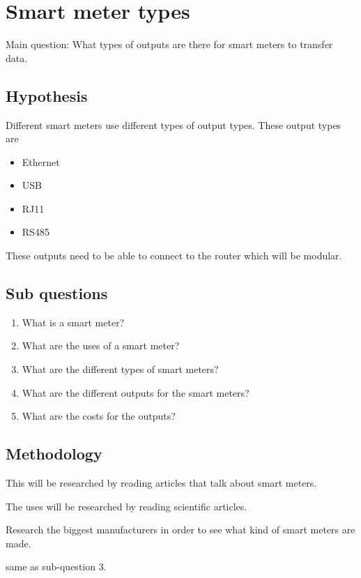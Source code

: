\newpage
\section{Smart meter types}

Main question: What types of outputs are there for smart meters to transfer data.

\subsection{Hypothesis}
Different smart meters use different types of output types. These output types are
\begin{itemize}
    \item Ethernet
    \item USB
    \item RJ11
    \item RS485
\end{itemize}
These outputs need to be able to connect to the router which will be modular.

\subsection{Sub questions}
\begin{enumerate}
    \item What is a smart meter?
    \item What are the uses of a smart meter?
    \item What are the different types of smart meters?
    \item What are the different outputs for the smart meters?
    \item What are the costs for the outputs?
\end{enumerate}

\subsection{Methodology}
This will be researched by reading articles that talk about smart meters.

The uses will be researched by reading scientific articles.

Research the biggest manufacturers in order to see what kind of smart meters are made.

same as sub-question 3.

